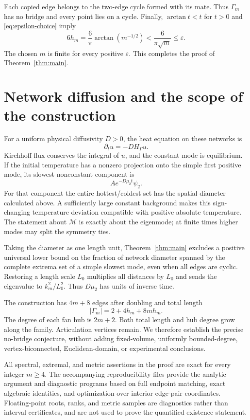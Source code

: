 \documentclass[11pt]{article}
\numberwithin{equation}{section}
\theoremstyle{remark}
\newcommand{\M}{\mathcal M}
\newcommand{\G}{\Gamma_m}
\begin{document}
Each copied edge belongs to the two-edge cycle formed with its
mate. Thus \(\G\) has no bridge and every point lies on a cycle.
Finally, \(\arctan t<t\) for \(t>0\) and
\eqref{eq:epsilon-choice} imply
\[
  6h_m
  =\frac{6}{\pi}\arctan(m^{-1/2})
  <\frac{6}{\pi\sqrt m}
  \leq\varepsilon.
\]
The chosen \(m\) is finite for every positive \(\varepsilon\).
This completes the proof of Theorem~\ref{thm:main}.

\section{Network diffusion and the scope of the construction}

For a uniform physical diffusivity \(D>0\), the heat equation on
these networks is
\[
  \partial_t u=-D H_\Gamma u.
\]
Kirchhoff flux conserves the integral of \(u\), and the constant
mode is equilibrium. If the initial temperature has a nonzero
projection onto the simple first positive mode, its slowest
nonconstant component is
\[
  A e^{-D\mu_2t}\psi_2.
\]
For that component the entire hottest/coldest set has the spatial
diameter calculated above. A sufficiently large constant background
makes this sign-changing temperature deviation compatible with
positive absolute temperature. The statement about \(\M\) is
exactly about the eigenmode; at finite times higher modes may
split the symmetry ties.

Taking the diameter as one length unit, Theorem~\ref{thm:main}
excludes a positive universal lower bound on the fraction of
network diameter spanned by the complete extrema set of a simple
slowest mode, even when all edges are cyclic. Restoring a length
scale \(L_0\) multiplies all distances by \(L_0\) and sends the
eigenvalue to \(k_m^2/L_0^2\).
Thus \(D\mu_2\) has units of inverse time.

The construction has \(4m+8\) edges after doubling and total length
\begin{equation}\label{eq:total-length}
  |\Gamma_m|=2+4h_m+8mh_m.
\end{equation}
The degree of each fan hub is \(2m+2\).
Both total length and hub degree grow along the family.
Articulation vertices remain. We therefore establish the precise
no-bridge conjecture, without adding fixed-volume, uniformly
bounded-degree, vertex-biconnected, Euclidean-domain, or experimental
conclusions.

All spectral, extremal, and metric assertions in the proof are
exact for every integer \(m\geq4\). The accompanying reproducibility
files provide the analytic argument and diagnostic programs based
on full endpoint matching, exact algebraic identities, and
optimization over interior edge-pair coordinates. Floating-point
roots, ranks, and metric samples are diagnostics rather than
interval certificates, and are not used to prove the quantified
existence statement.
\end{document}
